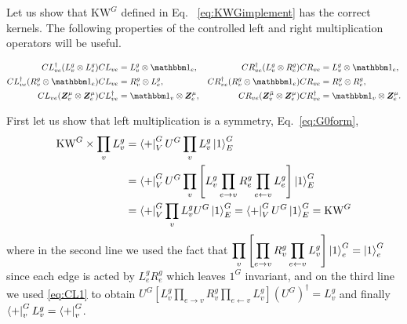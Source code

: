 \documentclass[nofootinbib,prx,twocolumn,showpacs,superscriptaddress,notitlepage,amsmath,amssymb]{revtex4-2}
\theoremstyle{definition}
\def\KW{\text{KW}}
\def\bra#1{\mathinner{\langle{#1}|}}
\def\ket#1{\mathinner{|{#1}\rangle}}
\def\bs#1{\boldsymbol{#1}}
\begin{document}
Let us show that $\KW^G$ defined in Eq. ~\eqref{eq:KWGimplement} has the correct kernels. The following properties of the controlled left and right multiplication operators will be useful.

\begin{align}
CL_{ve}^\dagger (L^g_v \otimes L^g_e )CL_{ve} &= L^g_v \otimes \mathbbm1_e, & CR_{ve}^\dagger(L^g_v \otimes R^g_e)CR_{ve} &= L^g_v \otimes \mathbbm1_e,\label{eq:CL1}\\
CL_{ve}^\dagger(R^g_v \otimes  \mathbbm 1_e) CL_{ve}  &= R^g_v \otimes L^g_e, & CR_{ve}^\dagger(R^g_v \otimes  \mathbbm 1_e)CR_{ve} &= R^g_v \otimes R^g_e,\label{eq:CL2}\\
CL_{ve}(\bs Z^\mu_v \otimes \bs Z^\mu_e)CL_{ve}^\dagger &=\mathbbm 1_v \otimes \bs Z^\mu_e, & CR_{ve}(\bs Z^{\bar \mu}_v \otimes \bs Z^\mu_e)CR_{ve}^\dagger &=\mathbbm 1_v \otimes \bs Z^\mu_e . \label{eq:CL4}
\end{align}


First let us show that left multiplication is a symmetry, Eq.~\eqref{eq:G0form},
\begin{align}
\begin{split}
\KW^G  \times \prod_v L^g_v &=\bra{+}^G_V U^G \prod_v L^g_v \ket{1}^G_E \\
&= \bra{+}^G_V U^G \prod_v\left [ L^g_v \prod_{e\rightarrow v} R^g_e\prod_{e\leftarrow v} L^g_e \right] \ket{1}^G_E \\
&=\bra{+}^G_V \prod_v L^g_v U^G \ket{1}^G_E  = \bra{+}^G_V  U^G \ket{1}^G_E =\KW^G
\end{split}
\end{align}
where in the second line  we used the fact that  $\displaystyle \prod_v  \left [ \prod_{e\rightarrow v} R^g_v\prod_{e\leftarrow v} L^g_v \right]\ket{1}^G_e =\ket{1}^G_e$ since each edge is acted by $L^g_eR^g_e$ which leaves $1^G$ invariant, and on the third line we used \eqref{eq:CL1} to obtain $\displaystyle U^G  \left[L^g_v \prod_{e\rightarrow v} R^g_v\prod_{e\leftarrow v} L^g_v\right]  \left(U^G\right)^\dagger =  L^g_v$ and finally $\bra{+}^G_v L^g_v = \bra{+}^G_v$.
\end{document}
